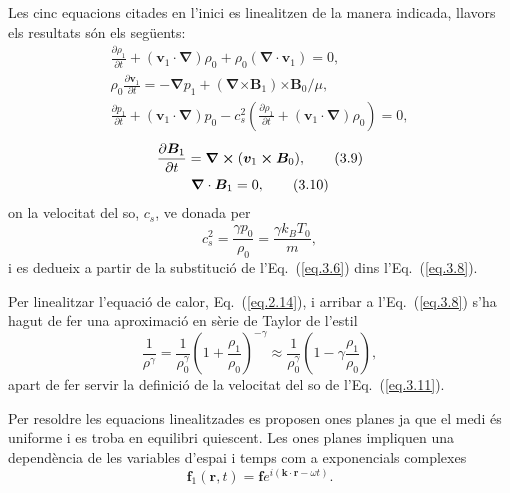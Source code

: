 Les cinc equacions citades en l'inici es linealitzen de la manera indicada, llavors els resultats són els següents:
\begin{gather}
	\frac{\partial \rho_1}{\partial t} + (\bm{v}_1 \cdot \bm{\nabla}) \rho_0 + \rho_0 (\bm{\nabla} \cdot \bm{v}_1) = 0, \tag{3.6} \label{eq.3.6} \\
	\rho_0 \frac{\partial \bm{v}_1}{\partial t} = - \bm{\nabla} p_1 + (\bm{\nabla} \bm{\times} \bm{B}_1) \bm{\times} \bm{B}_0 / \mu, \tag{3.7} \label{eq.3.7} \\
	\frac{\partial p_1}{\partial t} + (\bm{v}_1 \cdot \bm{\nabla}) p_0 - c_s^2 \left( \frac{\partial \rho_1}{\partial t} + (\bm{v}_1 \cdot \bm{\nabla}) \rho_0 \right) = 0, \tag{3.8} \label{eq.3.8}
\end{gather}
\begin{gather}
	\frac{\partial \bm{B}_1}{\partial t} = \bm{\nabla} \bm{\times} (\bm{v}_1 \bm{\times} \bm{B}_0), \tag{3.9} \label{eq.3.9} \\
	\bm{\nabla} \cdot \bm{B}_1 = 0, \tag{3.10} \label{eq.3.10}
\end{gather}
on la velocitat del so, $c_s$, ve donada per
\begin{equation}
	c_s^2 = \frac{\gamma p_0}{\rho_0} = \frac{\gamma k_B T_0}{m}, \tag{3.11} \label{eq.3.11}
\end{equation}
i es dedueix a partir de la substitució de l'Eq.~(\ref{eq.3.6}) dins l'Eq.~(\ref{eq.3.8}).

Per linealitzar l'equació de calor, Eq.~(\ref{eq.2.14}), i arribar a l'Eq.~(\ref{eq.3.8}) s'ha hagut de fer una aproximació en sèrie de Taylor de l'estil
\begin{equation}
	\frac{1}{\rho^{\gamma}} = \frac{1}{\rho_0^{\gamma}} \left( 1 + \frac{\rho_1}{\rho_0} \right)^{-\gamma} \approx \frac{1}{\rho_0^{\gamma}} \left( 1 - \gamma \frac{\rho_1}{\rho_0} \right), \tag{3.12} \label{eq.3.12}
\end{equation}
apart de fer servir la definició de la velocitat del so de l'Eq.~(\ref{eq.3.11}).

Per resoldre les equacions linealitzades es proposen ones planes ja que el medi és uniforme i es troba en equilibri quiescent.
Les ones planes impliquen una dependència de les variables d'espai i temps com a exponencials complexes
\begin{equation}
	\bm{f}_1(\bm{r},t) = \bm{f} e^{i(\bm{k} \cdot \bm{r} - \omega t)}. \tag{3.13} \label{eq.3.13}
\end{equation}

